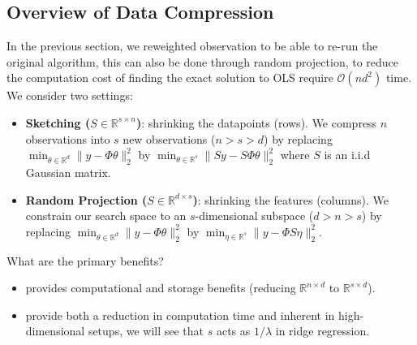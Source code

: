\documentclass[
11pt,notheorems,hyperref={pdfauthor=whatever}
]{beamer}
\begin{document}
\subsection{Overview of Data Compression}
\begin{frame}
    In the previous section, we reweighted observation to be able to re-run the original algorithm, this can also be done through random projection, to reduce the computation cost of finding the exact solution to OLS require \(\mathcal{O}(nd^2)\) time.
    We consider two settings:
    \begin{itemize}
        \item \alert{\textbf{Sketching (\(S \in \mathbb{R}^{s \times n}\))}}: shrinking the datapoints (rows). We compress \(n\) observations into \(s\) new observations (\(n > s > d\)) by replacing \(\min_{\theta \in \mathbb{R}^d}\|y - \Phi\theta \|^2_2 \) by \(\min_{\theta \in \mathbb{R}^s}\|Sy - S\Phi\theta \|^2_2 \) where \(S\) is an i.i.d Gaussian matrix.
        \item \alert{\textbf{Random Projection (\(S \in \mathbb{R}^{d \times s}\))}}: shrinking the features (columns). We constrain our search space to an \(s\)-dimensional subspace (\(d > n > s\)) by replacing \(\min_{\theta \in \mathbb{R}^d}\|y - \Phi\theta \|^2_2 \) by \(\min_{\eta \in \mathbb{R}^s}\|y - \Phi S \eta \|^2_2 \).
    \end{itemize}
    What are the primary benefits?
    \begin{itemize}
    \item {} provides computational and storage benefits (reducing \(\mathbb{R}^{n \times d}\) to \(\mathbb{R}^{s \times d}\)).
    \item {} provide both a reduction in computation time and inherent  in high-dimensional setups, we will see that $s$ acts as $1/\lambda$ in ridge regression. 
\end{itemize}
\end{frame}
\end{document}
